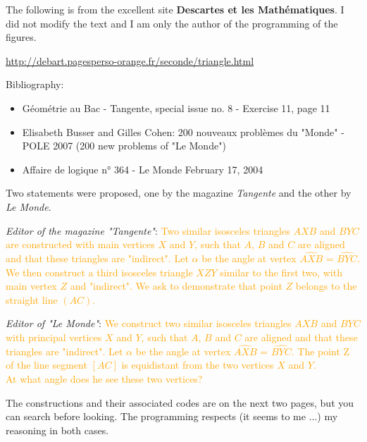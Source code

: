 The following is from the excellent site \textbf{Descartes et les Mathématiques}. I did not modify the text and I am only the author of the programming of the figures.

\url{http://debart.pagesperso-orange.fr/seconde/triangle.html}

Bibliography:

\begin{itemize}
\item   Géométrie au Bac - Tangente, special issue no. 8 - Exercise 11, page 11

\item   Elisabeth Busser and Gilles Cohen: 200 nouveaux problèmes du "Monde" - POLE 2007 (200 new problems of "Le Monde")

\item   Affaire de logique n° 364 - Le Monde February 17, 2004
\end{itemize}


Two statements were proposed, one by the magazine \textit{Tangente} and the other by \textit{Le Monde}.

\vspace*{2cm}
\emph{Editor of the magazine "Tangente"}: \textcolor{orange}{Two similar isosceles triangles $AXB$ and $BYC$ are constructed with main vertices $X$ and $Y$, such that $A$, $B$ and $C$ are aligned and that these triangles are "indirect". Let $\alpha$ be the angle at vertex $\widehat{AXB}$ = $\widehat{BYC}$. We then construct a third isosceles triangle $XZY$ similar to the first two, with main vertex $Z$ and "indirect".
We ask to demonstrate that point $Z$ belongs to the straight line $(AC)$.}

\vspace*{2cm}
\emph{Editor of  "Le Monde"}: \textcolor{orange}{We construct two similar isosceles triangles $AXB$ and $BYC$ with principal vertices $X$ and $Y$, such that $A$, $B$ and $C$ are aligned and that these triangles are "indirect". Let $\alpha$ be the angle at vertex $\widehat{AXB}$ = $\widehat{BYC}$. The point Z of the line segment $[AC]$ is equidistant from the two vertices $X$ and $Y$.\\
At what angle does he see these two vertices?}

\vspace*{2cm} The constructions and their associated codes are on the next two pages, but you can search before looking. The programming respects (it seems to me ...) my reasoning in both cases.

